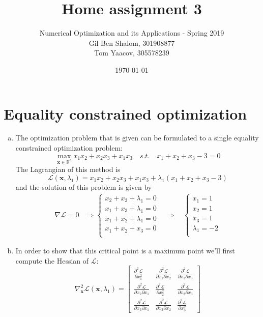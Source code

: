 \documentclass{article}
\title{Home assignment 3}
\author{Numerical Optimization and its Applications - Spring 2019\\Gil Ben Shalom, 301908877\\Tom Yaacov, 305578239}
\date{\today}
\begin{document}
\maketitle

\section{Equality constrained optimization}
\begin{enumerate}[(a)] 
\item The optimization problem that is given can be formulated to a single equality constrained optimization problem:
\[\max_{\mathbf{x}\in \mathbb{R}^3}x_1x_2+x_2x_3+x_1x_3 \quad s.t. \quad x_1+x_2+x_3-3=0\]
The Lagrangian of this method is
\[\mathcal{L}(\mathbf{x}, \lambda_1) =  x_1x_2+x_2x_3+x_1x_3 + \lambda_1(x_1+x_2+x_3-3) \]
and the solution of this problem is given by
\begin{align*}
\nabla \mathcal{L} = 0 &\Rightarrow 
\begin{cases}
x_2+x_3+\lambda_1 = 0\\
x_1+x_3+\lambda_1 = 0\\
x_1+x_2+\lambda_1 = 0 \\
x_1+x_2+x_3 = 0 \\
\end{cases}
&\Rightarrow \quad
\begin{cases}
x_1=1\\
x_2=1\\
x_3=1\\
\lambda_1=-2\\
\end{cases}
\end{align*}
\item In order to show that this critical point is a maximum point we'll first compute the Hessian of $\mathcal{L}$:
\[\nabla_{\mathbf{x}}^2 \mathcal{L}(\mathbf{x}, \lambda_1) = 
\begin{bmatrix} 
\frac{\partial^2 \mathcal{L}}{\partial x_1^2} & \frac{\partial ^2 \mathcal{L}}{\partial x_1\partial x_2} & \frac{\partial ^2 \mathcal{L}}{\partial x_1\partial x_3} \\
\frac{\partial^2 \mathcal{L}}{\partial x_2\partial x_1} & \frac{\partial ^2 \mathcal{L}}{\partial x_2^2} & \frac{\partial ^2 \mathcal{L}}{\partial x_2\partial x_3} \\
\frac{\partial^2 \mathcal{L}}{\partial x_3\partial x_1} & \frac{\partial ^2 \mathcal{L}}{\partial x_3\partial x_2} & \frac{\partial ^2 \mathcal{L}}{\partial x_3^2} 
\end{bmatrix}
\]
\end{enumerate}
\end{document}
